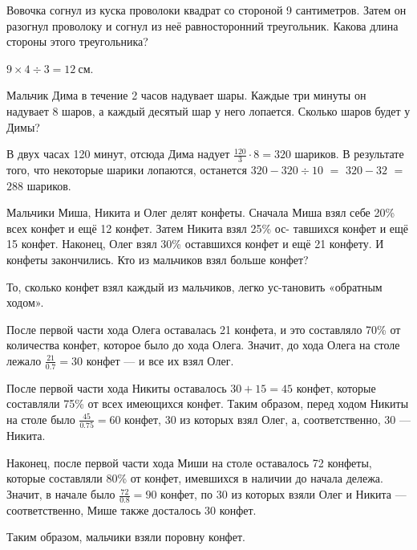 

\begin{itemize}

	\itA Вовочка согнул из куска проволоки квадрат со стороной 9 сантиметров. Затем он разогнул проволоку и согнул из неё равносторонний треугольник. Какова длина стороны этого треугольника?

	\itr $9 \times 4 \div 3 = \SI{12}{\text{см}}$.

	\itB Мальчик Дима в течение 2 часов надувает шары. Каждые три минуты он надувает 8 шаров, а каждый десятый шар у него лопается. Сколько шаров будет у Димы?
	
	\itr В двух часах 120 минут, отсюда Дима надует $\tfrac{120}{3} \cdot 8 = 320$ шариков. В результате того, что некоторые шарики лопаются, останется $320 - 320 \div 10$ $=$ $320 - 32$ $=$ $288$ шариков.
	
	\itC Мальчики Миша, Никита и Олег делят конфеты. Сначала Миша взял себе 20\% всех конфет и ещё 12 конфет. Затем Никита взял 25\% ос- тавшихся конфет и ещё 15 конфет. Наконец, Олег взял 30\% оставшихся конфет и ещё 21 конфету. И конфеты закончились. Кто из мальчиков взял больше конфет?
	
	\itr То, сколько конфет взял каждый из мальчиков, легко ус-\linebreak тановить «обратным ходом».
	
	После первой части хода Олега оставалась 21 конфета, и это составляло 70\% от количества конфет, которое было до хода Олега. Значит, до хода Олега на столе лежало $\tfrac{21}{0.7} = 30$ конфет — и все их взял Олег.
	
	После первой части хода Никиты оставалось $30+15=45$ конфет, которые составляли 75\% от всех имеющихся конфет. Таким образом, перед ходом Никиты на столе было $\tfrac{45}{0.75}=60$ конфет, 30 из которых взял Олег, а, соответственно, 30 — Никита.
	
	Наконец, после первой части хода Миши на столе оставалось 72 \linebreak конфеты, которые составляли 80\% от конфет, имевшихся в наличии до начала дележа. Значит, в начале было $\tfrac{72}{0.8} = 90$ конфет, по 30 из которых взяли Олег и Никита — соответственно, Мише также досталось 30 конфет.
	
	Таким образом, мальчики взяли поровну конфет.

\end{itemize}



